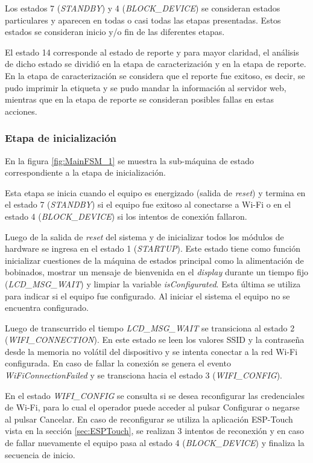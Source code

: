 Los estados 7 (\textit{STANDBY}) y 4 (\textit{BLOCK\_DEVICE}) se consideran estados particulares y aparecen en todas o casi todas las etapas presentadas. Estos estados se consideran inicio y/o fin de las diferentes etapas.

El estado 14 corresponde al estado de reporte y para mayor claridad, el análisis de dicho estado se dividió en la etapa de caracterización y en la etapa de reporte. En la etapa de caracterización se considera que el reporte fue exitoso, es decir, se pudo imprimir la etiqueta y se pudo mandar la información al servidor web, mientras que en la etapa de reporte se consideran posibles fallas en estas acciones.

\subsubsection{Etapa de inicialización}
\label{subsubsec:EtIni}
En la figura \ref{fig:MainFSM_1} se muestra la sub-máquina de estado correspondiente a la etapa de inicialización. 

Esta etapa se inicia cuando el equipo es energizado (salida de \textit{reset}) y termina en el estado 7 (\textit{STANDBY}) si el equipo fue exitoso al conectarse a Wi-Fi o en el estado  4 (\textit{BLOCK\_DEVICE}) si los intentos de conexión fallaron. 

Luego de la salida de \textit{reset} del sistema y de inicializar todos los módulos de hardware se ingresa en el estado 1 (\textit{STARTUP}). Este estado tiene como función inicializar cuestiones de la máquina de estados principal como la alimentación de bobinados, mostrar un mensaje de bienvenida en el \textit{display} durante un tiempo fijo (\textit{LCD\_MSG\_WAIT}) y limpiar la variable \textit{isConfigurated}. Esta última se utiliza para indicar si el equipo fue configurado. Al iniciar el sistema el equipo no se encuentra configurado.

Luego de transcurrido el tiempo \textit{LCD\_MSG\_WAIT} se transiciona al estado 2 (\textit{WIFI\_CONNECTION}). En este estado se leen los valores SSID y la contraseña desde la memoria no volátil del dispositivo y se intenta conectar a la red Wi-Fi configurada. En caso de fallar la conexión se genera el evento \textit{WiFiConnectionFailed} y se transciona hacia el estado 3 (\textit{WIFI\_CONFIG}). 

En el estado \textit{WIFI\_CONFIG} se consulta si se desea reconfigurar las credenciales de Wi-Fi, para lo cual el operador puede acceder al pulsar Configurar o negarse al pulsar Cancelar. En caso de reconfigurar se utiliza la aplicación ESP-Touch vista en la sección \ref{sec:ESPTouch}, se realizan 3 intentos de reconexión y en caso de fallar nuevamente el equipo pasa al estado 4 (\textit{BLOCK\_DEVICE}) y finaliza la secuencia de inicio.

